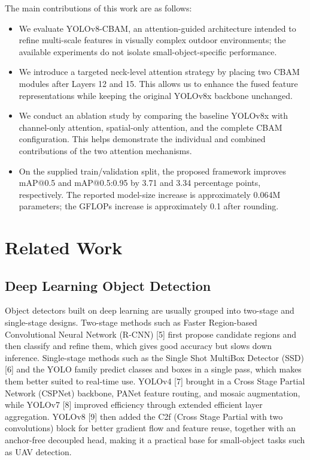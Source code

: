 \documentclass[conference]{IEEEtran}
\begin{document}
The main contributions of this work are as follows:
\begin{itemize}
\item We evaluate YOLOv8-CBAM, an attention-guided architecture intended to refine multi-scale features in visually complex outdoor environments; the available experiments do not isolate small-object-specific performance.
\item We introduce a targeted neck-level attention strategy by placing two CBAM modules after Layers 12 and 15. This allows us to enhance the fused feature representations while keeping the original YOLOv8x backbone unchanged.
\item We conduct an ablation study by comparing the baseline YOLOv8x with channel-only attention, spatial-only attention, and the complete CBAM configuration. This helps demonstrate the individual and combined contributions of the two attention mechanisms.
\item On the supplied train/validation split, the proposed framework improves mAP@0.5 and mAP@0.5:0.95 by 3.71 and 3.34 percentage points, respectively. The reported model-size increase is approximately 0.064M parameters; the GFLOPs increase is approximately 0.1 after rounding.
\end{itemize}


\section{Related Work}

\subsection{Deep Learning Object Detection}

Object detectors built on deep learning are usually grouped into two-stage and single-stage designs. Two-stage methods such as Faster Region-based Convolutional Neural Network (R-CNN) [5] first propose candidate regions and then classify and refine them, which gives good accuracy but slows down inference. Single-stage methods such as the Single Shot MultiBox Detector (SSD) [6] and the YOLO family predict classes and boxes in a single pass, which makes them better suited to real-time use. YOLOv4 [7] brought in a Cross Stage Partial Network (CSPNet) backbone, PANet feature routing, and mosaic augmentation, while YOLOv7 [8] improved efficiency through extended efficient layer aggregation. YOLOv8 [9] then added the C2f (Cross Stage Partial with two convolutions) block for better gradient flow and feature reuse, together with an anchor-free decoupled head, making it a practical base for small-object tasks such as UAV detection.
\end{document}
